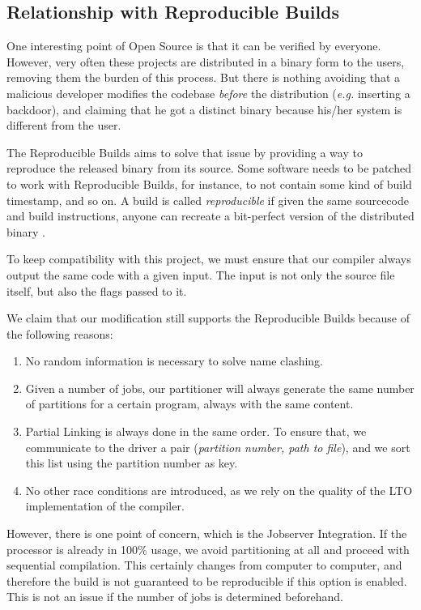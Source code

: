 \documentclass[runningheads]{llncs}
\begin{document}
\subsection{Relationship with Reproducible Builds}\label{sec:repro_builds}

One interesting point of Open Source is that it can be verified by everyone.
However, very often these projects are distributed in a binary form to the
users, removing them the burden of this process. But there is nothing
avoiding that a malicious developer modifies the codebase \textit{before}
the distribution (\textit{e.g.} inserting a backdoor), and claiming that
he got a distinct binary because his/her system is different from the user.

The Reproducible Builds aims to solve that issue by providing a way to
reproduce the released binary from its source. Some software needs to
be patched to work with Reproducible Builds, for instance,
to not contain some kind of build timestamp, and so on. A build
is called \textit{reproducible} if given the same sourcecode and build
instructions, anyone can recreate a bit-perfect version of the distributed
binary \cite{reproducible_builds}.

To keep compatibility with this project, we must ensure that our compiler
always output the same code with a given input. The input is not only
the source file itself, but also the flags passed to it.

We claim that our modification still supports the Reproducible Builds because
of the following reasons:

\begin{enumerate}
	\item No random information is necessary to solve name clashing.
	\item Given a number of jobs, our partitioner will always generate
	the same number of partitions for a certain program, always with the same content.
	\item Partial Linking is always done in the same order. To ensure that,
	we communicate to the driver a pair (\textit{partition number, path to file}),
	and we sort this list using the partition number as key.
	\item No other race conditions are introduced, as we rely on the quality of
	the LTO implementation of the compiler.
\end{enumerate}

However, there is one point of concern, which is the Jobserver Integration.  If
the processor is already in 100\% usage, we avoid partitioning at all and
proceed with sequential compilation. This certainly changes from computer to
computer, and therefore the build is not guaranteed to be reproducible if this
option is enabled. This is not an issue if the number of jobs is determined
beforehand.
\end{document}
